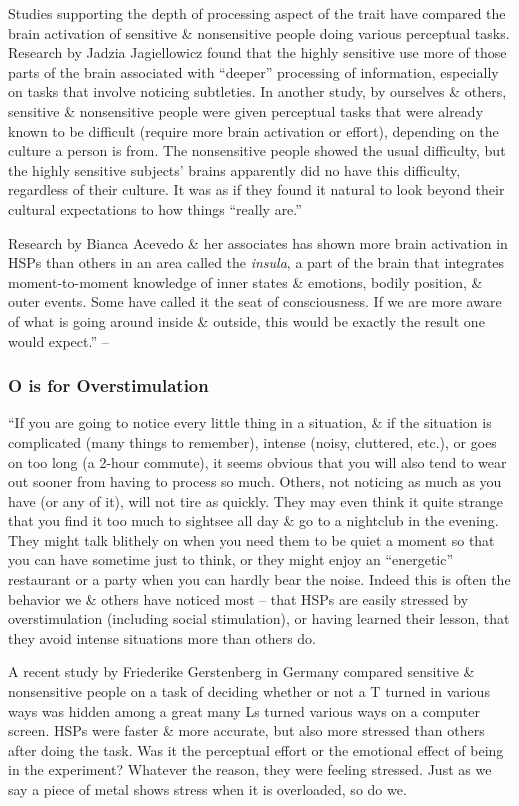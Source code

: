 \documentclass{article}
\numberwithin{equation}{section}
\begin{document}
Studies supporting the depth of processing aspect of the trait have compared the brain activation of sensitive \& nonsensitive people doing various perceptual tasks. Research by Jadzia Jagiellowicz found that the highly sensitive use more of those parts of the brain associated with ``deeper'' processing of information, especially on tasks that involve noticing subtleties. In another study, by ourselves \& others, sensitive \& nonsensitive people were given perceptual tasks that were already known to be difficult (require more brain activation or effort), depending on the culture a person is from. The nonsensitive people showed the usual difficulty, but the highly sensitive subjects' brains apparently did no have this difficulty, regardless of their culture. It was as if they found it natural to look beyond their cultural expectations to how things ``really are.''

Research by Bianca Acevedo \& her associates has shown more brain activation in HSPs than others in an area called the \textit{insula}, a part of the brain that integrates moment-to-moment knowledge of inner states \& emotions, bodily position, \& outer events. Some have called it the seat of consciousness. If we are more aware of what is going around inside \& outside, this would be exactly the result one would expect.'' -- \cite[pp. 18--19]{Aron2013}

\subsubsection*{O is for Overstimulation}
``If you are going to notice every little thing in a situation, \& if the situation is complicated (many things to remember), intense (noisy, cluttered, etc.), or goes on too long (a 2-hour commute), it seems obvious that you will also tend to wear out sooner from having to process so much. Others, not noticing as much as you have (or any of it), will not tire as quickly. They may even think it quite strange that you find it too much to sightsee all day \& go to a nightclub in the evening. They might talk blithely on when you need them to be quiet a moment so that you can have sometime just to think, or they might enjoy an ``energetic'' restaurant or a party when you can hardly bear the noise. Indeed this is often the behavior we \& others have noticed most -- that HSPs are easily stressed by overstimulation (including social stimulation), or having learned their lesson, that they avoid intense situations more than others do.

A recent study by Friederike Gerstenberg in Germany compared sensitive \& nonsensitive people on a task of deciding whether or not a T turned in various ways was hidden among a great many Ls turned various ways on a computer screen. HSPs were faster \& more accurate, but also more stressed than others after doing the task. Was it the perceptual effort or the emotional effect of being in the experiment? Whatever the reason, they were feeling stressed. Just as we say a piece of metal shows stress when it is overloaded, so do we.
\end{document}
